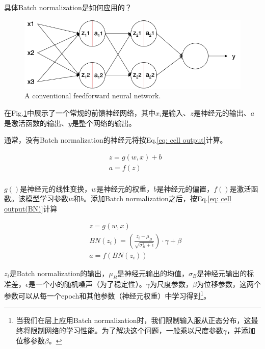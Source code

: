 \documentclass[letterpaper,10pt]{article}
\begin{document}
	具体Batch normalization是如何应用的？
	
	\begin{figure}[htbp]
		\centering 
		\includegraphics[width=0.8\columnwidth]{picture/neural-network}
		\captionsetup{font=scriptsize}
		\caption{
			\label{fig: Neural Network} 
			A conventional feedforward neural network.
		}
	\end{figure}
	
	在Fig.\ref{fig: Neural Network}中展示了一个常规的前馈神经网络，其中$x_i$是输入、$z$是神经元的输出、$a$是激活函数的输出、$y$是整个网络的输出。
	
	通常，没有Batch normalization的神经元将按Eq.\ref{eq: cell output}计算。
	
	\begin{equation}
		\begin{aligned}
			& z = g \left( w,x \right) + b \\
			& a = f(z) \\
		\end{aligned}
		\label{eq: cell output}
	\end{equation}
	
	$g()$是神经元的线性变换，$w$是神经元的权重，$b$是神经元的偏置，$f()$是激活函数。该模型学习参数$w$和$b$。添加Batch normalization之后，按Eq.\ref{eq: cell output(BN)}计算
	
	\begin{equation}
		\begin{aligned}
			& z = g \left( w,x \right)\\
			& BN(z_i) = \left(\frac{z_i-\mu_B}{\sqrt{\sigma_B^2 + \epsilon}}\right) \cdot \gamma + \beta \\
			& a = f(BN(z_i)) 
		\end{aligned}
		\label{eq: cell output(BN)}
	\end{equation}
	
	$z_i$是Batch normalization的输出，$\mu_B$是神经元输出的均值，$\sigma_B$是神经元输出的标准差，$\epsilon$是一个小的随机噪声（为了稳定性）。$\gamma$为尺度参数，$\beta$为位移参数，这两个参数可以从每一个epoch和其他参数（神经元权重）中学习得到\footnote{当我们在层上应用Batch normalization时，我们限制输入服从正态分布，这最终将限制网络的学习性能。为了解决这个问题，一般乘以尺度参数$\gamma$，并添加位移参数$\beta$。}。
	
\end{document}
